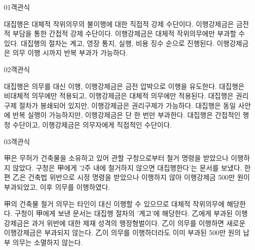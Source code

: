 \documentclass[fs85,seriesWit]{korfarm-base}
\begin{document}
\kfBeginMC
\begin{kfQBlock}{01}{객관식}
\begin{kfChoices}
\kfChoice 대집행은 대체적 작위의무의 불이행에 대한 직접적 강제 수단이다.
\kfChoice 이행강제금은 금전적 부담을 통한 간접적 강제 수단이다.
\kfChoice 이행강제금은 대체적 작위의무에만 부과할 수 있다.
\kfChoice 대집행의 절차는 계고, 영장 통지, 실행, 비용 징수 순으로 진행된다.
\kfChoice 이행강제금은 의무 이행 시까지 반복 부과가 가능하다.
\end{kfChoices}
\end{kfQBlock}

\begin{kfQBlock}{02}{객관식}
\begin{kfChoices}
\kfChoice 대집행은 의무를 대신 이행, 이행강제금은 금전 압박으로 이행을 유도한다.
\kfChoice 대집행은 비대체적 의무에만 적용되고, 이행강제금은 대체적 의무에만 적용된다.
\kfChoice 대집행은 권리구제 절차가 봉쇄되어 있지만, 이행강제금은 권리구제가 가능하다.
\kfChoice 대집행은 동일 사안에 반복 실행이 가능하지만, 이행강제금은 단 한 번만 부과한다.
\kfChoice 대집행은 간접적인 행정 수단이고, 이행강제금은 의무자에게 직접적인 수단이다.
\end{kfChoices}
\end{kfQBlock}

\begin{kfQBlock}{03}{객관식}
\begin{kfEvidence}甲은 무허가 건축물을 소유하고 있어 관할 구청으로부터 철거 명령을 받았으나 이행하지 않았다. 구청은 甲에게 '2주 내에 철거하지 않으면 대집행한다'는 문서를 보냈다. 한편 乙은 건축법 위반으로 시정 명령을 받았으나 이행하지 않아 이행강제금 500만 원이 부과되었고, 이후 의무를 이행하였다.\end{kfEvidence}
\begin{kfChoices}
\kfChoice 甲의 건축물 철거 의무는 타인이 대신 이행할 수 있으므로 대체적 작위의무에 해당한다.
\kfChoice 구청이 甲에게 보낸 문서는 대집행 절차의 '계고'에 해당한다.
\kfChoice 乙에게 부과된 이행강제금은 과거 위반에 대한 제재 성격의 행정형벌이다.
\kfChoice 乙이 의무를 이행하면 새로운 이행강제금은 부과되지 않는다.
\kfChoice 乙이 의무를 이행하더라도 이미 부과된 500만 원의 납부 의무는 소멸하지 않는다.
\end{kfChoices}
\end{kfQBlock}
\end{document}
